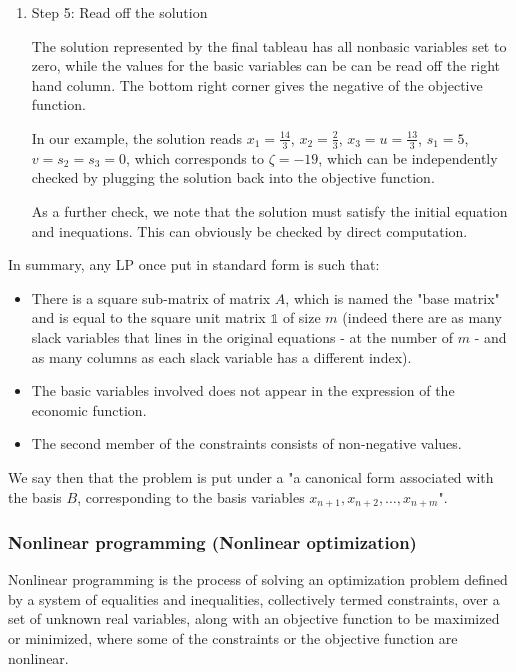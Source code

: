 \begin{enumerate}
	\item Step 5: Read off the solution

	The solution represented by the final tableau has all nonbasic
	variables set to zero, while the values for the basic variables can be
	can be read off the right hand column.  The bottom right corner gives
	the negative of the objective function.
	
	In our example, the solution reads $x_1=\tfrac{14}3$, $x_2=\tfrac23$,
	$x_3=u=\tfrac{13}3$, $s_1=5$, $v=s_2=s_3=0$, which corresponds to
	$\zeta=-19$, which can be independently checked by plugging the
	solution back into the objective function.
	
	As a further check, we note that the solution must satisfy the initial equation and inequations.  This can obviously be checked by direct computation.
	\end{enumerate}
	In summary, any LP once put in standard form is such that:
	\begin{itemize}
		\item There is a square sub-matrix of matrix $A$, which is named the "base matrix" and is equal to the square unit matrix $\mathds{1}$ of size $m$ (indeed there are as many slack variables that lines in the original equations - at the number of $m$ - and as many columns as each slack variable has a different index).

		\item The basic variables involved does not appear in the expression of the economic function.

		\item The second member of the constraints consists of non-negative values.
	\end{itemize}
	We say then that the problem is put under a "a canonical form associated with the basis $B$, corresponding to the basis variables $x_{n+1},x_{n+2},\ldots,x_{n+m}$".
	
	\subsubsection{Nonlinear programming (Nonlinear optimization)}\label{nonlinear optimization}
	Nonlinear programming is the process of solving an optimization problem defined by a system of equalities and inequalities, collectively termed constraints, over a set of unknown real variables, along with an objective function to be maximized or minimized, where some of the constraints or the objective function are nonlinear. 
	
